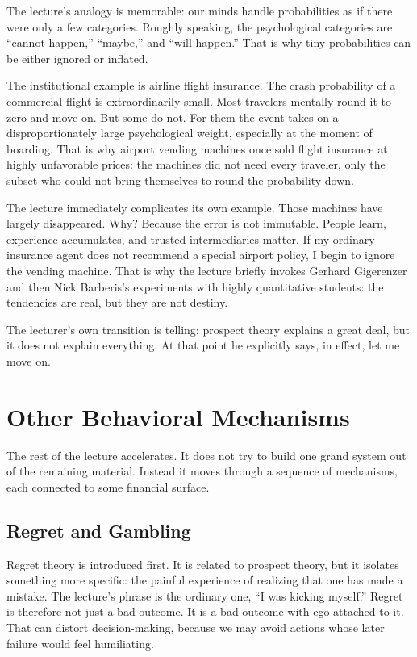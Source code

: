 The lecture's analogy is memorable: our minds handle probabilities as if there were only a few categories. Roughly speaking, the psychological categories are ``cannot happen,'' ``maybe,'' and ``will happen.'' That is why tiny probabilities can be either ignored or inflated.

The institutional example is airline flight insurance. The crash probability of a commercial flight is extraordinarily small. Most travelers mentally round it to zero and move on. But some do not. For them the event takes on a disproportionately large psychological weight, especially at the moment of boarding. That is why airport vending machines once sold flight insurance at highly unfavorable prices: the machines did not need every traveler, only the subset who could not bring themselves to round the probability down.

The lecture immediately complicates its own example. Those machines have largely disappeared. Why? Because the error is not immutable. People learn, experience accumulates, and trusted intermediaries matter. If my ordinary insurance agent does not recommend a special airport policy, I begin to ignore the vending machine. That is why the lecture briefly invokes Gerhard Gigerenzer and then Nick Barberis's experiments with highly quantitative students: the tendencies are real, but they are not destiny.

The lecturer's own transition is telling: prospect theory explains a great deal, but it does not explain everything. At that point he explicitly says, in effect, let me move on.

\section{Other Behavioral Mechanisms}

The rest of the lecture accelerates. It does not try to build one grand system out of the remaining material. Instead it moves through a sequence of mechanisms, each connected to some financial surface.

\subsection{Regret and Gambling}

Regret theory is introduced first. It is related to prospect theory, but it isolates something more specific: the painful experience of realizing that one has made a mistake. The lecture's phrase is the ordinary one, ``I was kicking myself.'' Regret is therefore not just a bad outcome. It is a bad outcome with ego attached to it. That can distort decision-making, because we may avoid actions whose later failure would feel humiliating.

